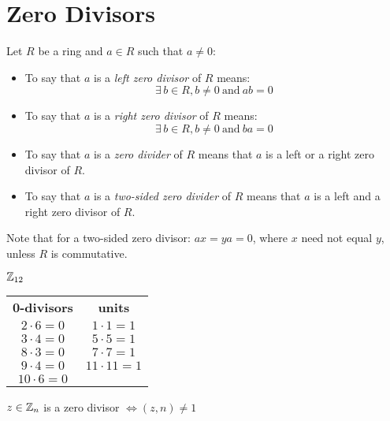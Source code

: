 \documentclass[letterpaper,12pt,fleqn]{article}
\begin{document}
\section*{Zero Divisors}

\begin{definition}
  Let $R$ be a ring and $a\in R$ such that $a\ne0$:
  \begin{itemize}
  \item To say that $a$ is a \emph{left zero divisor} of $R$ means:
    \[\exists\,b\in R,b\ne0\ \mbox{and}\ ab=0\]

  \item To say that $a$ is a \emph{right zero divisor} of $R$ means:
    \[\exists\,b\in R,b\ne0\ \mbox{and}\ ba=0\]

  \item To say that $a$ is a \emph{zero divider} of $R$ means that $a$ is a
    left or a right zero divisor of $R$.

  \item To say that $a$ is a \emph{two-sided zero divider} of $R$ means that
    $a$ is a left and a right zero divisor of $R$.
  \end{itemize}
\end{definition}

Note that for a two-sided zero divisor: $ax=ya=0$, where $x$ need not equal
$y$, unless $R$ is commutative.

\begin{example}
  $\mathbb{Z}_{12}$

  \begin{tabular}{cc}
    \textbf{0-divisors} & \textbf{units} \\
    $2\cdot6=0$ & $1\cdot1=1$ \\
    $3\cdot4=0$ & $5\cdot5=1$ \\
    $8\cdot3=0$ & $7\cdot7=1$ \\
    $9\cdot4=0$ & $11\cdot11=1$ \\
    $10\cdot6=0$ & \\
  \end{tabular}
\end{example}

\begin{theorem}
  $z\in\mathbb{Z}_n$ is a zero divisor $\iff (z,n)\ne1$
\end{theorem}
\end{document}
